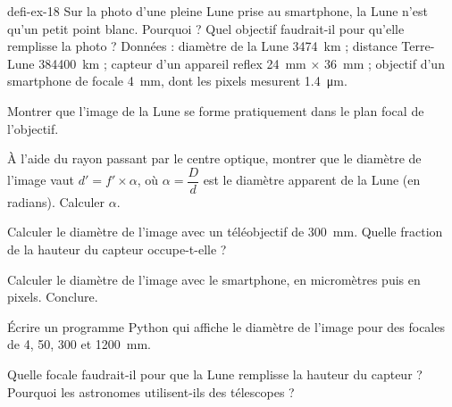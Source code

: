\begin{blocEdition}{defi-ex-18}
Sur la photo d'une pleine Lune prise au smartphone, la Lune n'est qu'un petit point blanc. Pourquoi ? Quel objectif faudrait-il
pour qu'elle remplisse la photo ?
Données : diamètre de la Lune \qty{3474}{km} ; distance Terre-Lune \qty{384400}{km} ; capteur d'un appareil reflex \qty{24}{mm} × \qty{36}{mm} ; objectif d'un
smartphone de focale \qty{4}{mm}, dont les pixels mesurent \qty{1,4}{\micro m}.
\begin{questions}
\item Montrer que l'image de la Lune se forme pratiquement dans le plan focal de l'objectif.
\item À l'aide du rayon passant par le centre optique, montrer que le diamètre de l'image vaut $d'=f'\times\alpha$, où $\alpha=\dfrac{D}{d}$ est le
diamètre apparent de la Lune (en radians). Calculer $\alpha$.
\item Calculer le diamètre de l'image avec un téléobjectif de \qty{300}{mm}. Quelle fraction de la hauteur du capteur occupe-t-elle ?
\item Calculer le diamètre de l'image avec le smartphone, en micromètres puis en pixels. Conclure.
\item Écrire un programme Python qui affiche le diamètre de l'image pour des focales de 4, 50, 300 et \qty{1200}{mm}.
\item Quelle focale faudrait-il pour que la Lune remplisse la hauteur du capteur ? Pourquoi les astronomes utilisent-ils des télescopes ?
\end{questions}
\end{blocEdition}

